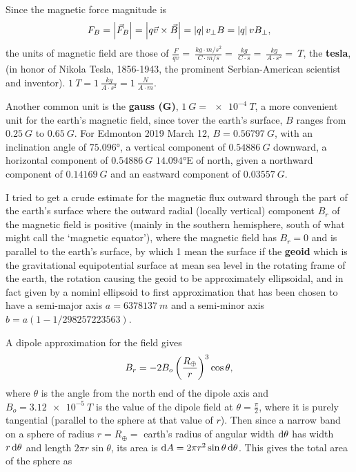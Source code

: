 Since the magnetic force magnitude is
\begin{equation}
F_B = \left| \vec{F}_B \right| = \left| q \vec{v} \times \vec{B} \right| = \left| q \right| v_\perp B = \left| q \right| v B_\perp ,
\end{equation}
the units of magnetic field are those of $\frac{F}{qv} = \SI{}{\frac{kg \cdot m/s^2}{C \cdot m/s} = \SI{}{\frac{kg}{C \cdot s}} = \SI{}{\frac{kg}{A \cdot s^2}} = \SI{}{T}}$, the \textbf{tesla}, (in honor of Nikola Tesla, 1856-1943, the prominent Serbian-American scientist and inventor). $\SI{1}{T} = \SI{1}{\frac{kg}{A \cdot s^2}} = \SI{1}{\frac{N}{A \cdot m}}$. 

Another common unit is the \textbf{gauss (G)}, $\SI{1}{G} = \SI{e-4}{T}$, a more convenient unit for the earth's magnetic field, since tover the earth's surface, $B$ ranges from $\SI{0.25}{G}$ to $\SI{0.65}{G}$. For Edmonton 2019 March 12, $B = \SI{0.56797}{G}$, with an inclination angle of $\ang{75.096}$, a vertical component of $\SI{0.54886}{G}$ downward, a horizontal component of $\SI{0.54886}{G}$ $\ang{14.094}$E of north, given a northward component of $\SI{0.14169}{G}$ and an eastward component of $\SI{0.03557}{G}$.

I tried to get a crude estimate for the magnetic flux outward through the part of the earth's surface where the outward radial (locally vertical) component $B_r$ of the magnetic field is positive (mainly in the southern hemisphere, south of what might call the `magnetic equator'), where the magnetic field has $B_r = 0$ and is parallel to the earth's surface, by which 1 mean the surface if the \textbf{geoid} which is the gravitational equipotential surface at mean sea level in the rotating frame of the earth, the rotation causing the geoid to be approximately ellipsoidal, and in fact given by a nominl ellipsoid to first approximation that has been chosen to have a semi-major axis $a = \SI{6378137}{m}$ and a semi-minor axis $b=a(1-1/298257223563)$.

A dipole approximation for the field gives
\begin{equation}
B_r = -2B_o\left(\frac{R_\oplus}{r}\right)^3 \cos \theta,
\end{equation}
where $\theta$ is the angle from the north end of the dipole axis and $B_o = \SI{3.12e-5}{T}$ is the value of the dipole field at $\theta = \frac{\pi}{2}$, where it is purely tangential (parallel to the sphere at that value of $r$). Then since a narrow band on a sphere of radius $r = R_\oplus =$ earth's radius of angular width $\operatorname{d\!} \theta$ has width $r \operatorname{d\!} \theta$ and length $2 \pi r \sin \theta$, its area is $\operatorname{d\!} A = 2 \pi r^2 \sin \theta \operatorname{d\!} \theta$. This gives the total area of the sphere as